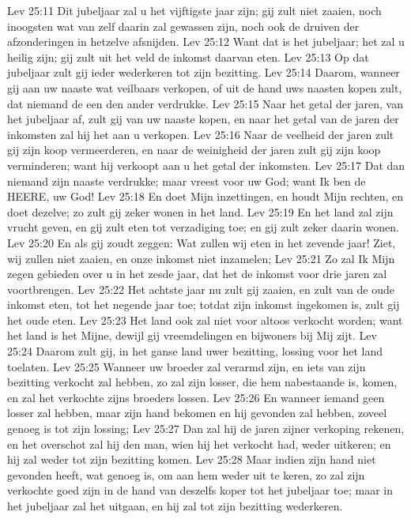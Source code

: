 Lev 25:11  Dit jubeljaar zal u het vijftigste jaar zijn; gij zult niet zaaien, noch inoogsten wat van zelf daarin zal gewassen zijn, noch ook de druiven der afzonderingen in hetzelve afsnijden.
Lev 25:12  Want dat is het jubeljaar; het zal u heilig zijn; gij zult uit het veld de inkomst daarvan eten.
Lev 25:13  Op dat jubeljaar zult gij ieder wederkeren tot zijn bezitting.
Lev 25:14  Daarom, wanneer gij aan uw naaste wat veilbaars verkopen, of uit de hand uws naasten kopen zult, dat niemand de een den ander verdrukke.
Lev 25:15  Naar het getal der jaren, van het jubeljaar af, zult gij van uw naaste kopen, en naar het getal van de jaren der inkomsten zal hij het aan u verkopen.
Lev 25:16  Naar de veelheid der jaren zult gij zijn koop vermeerderen, en naar de weinigheid der jaren zult gij zijn koop verminderen; want hij verkoopt aan u het getal der inkomsten.
Lev 25:17  Dat dan niemand zijn naaste verdrukke; maar vreest voor uw God; want Ik ben de HEERE, uw God!
Lev 25:18  En doet Mijn inzettingen, en houdt Mijn rechten, en doet dezelve; zo zult gij zeker wonen in het land.
Lev 25:19  En het land zal zijn vrucht geven, en gij zult eten tot verzadiging toe; en gij zult zeker daarin wonen.
Lev 25:20  En als gij zoudt zeggen: Wat zullen wij eten in het zevende jaar! Ziet, wij zullen niet zaaien, en onze inkomst niet inzamelen;
Lev 25:21  Zo zal Ik Mijn zegen gebieden over u in het zesde jaar, dat het de inkomst voor drie jaren zal voortbrengen.
Lev 25:22  Het achtste jaar nu zult gij zaaien, en zult van de oude inkomst eten, tot het negende jaar toe; totdat zijn inkomst ingekomen is, zult gij het oude eten.
Lev 25:23  Het land ook zal niet voor altoos verkocht worden; want het land is het Mijne, dewijl gij vreemdelingen en bijwoners bij Mij zijt.
Lev 25:24  Daarom zult gij, in het ganse land uwer bezitting, lossing voor het land toelaten.
Lev 25:25  Wanneer uw broeder zal verarmd zijn, en iets van zijn bezitting verkocht zal hebben, zo zal zijn losser, die hem nabestaande is, komen, en zal het verkochte zijns broeders lossen.
Lev 25:26  En wanneer iemand geen losser zal hebben, maar zijn hand bekomen en hij gevonden zal hebben, zoveel genoeg is tot zijn lossing;
Lev 25:27  Dan zal hij de jaren zijner verkoping rekenen, en het overschot zal hij den man, wien hij het verkocht had, weder uitkeren; en hij zal weder tot zijn bezitting komen.
Lev 25:28  Maar indien zijn hand niet gevonden heeft, wat genoeg is, om aan hem weder uit te keren, zo zal zijn verkochte goed zijn in de hand van deszelfs koper tot het jubeljaar toe; maar in het jubeljaar zal het uitgaan, en hij zal tot zijn bezitting wederkeren.
